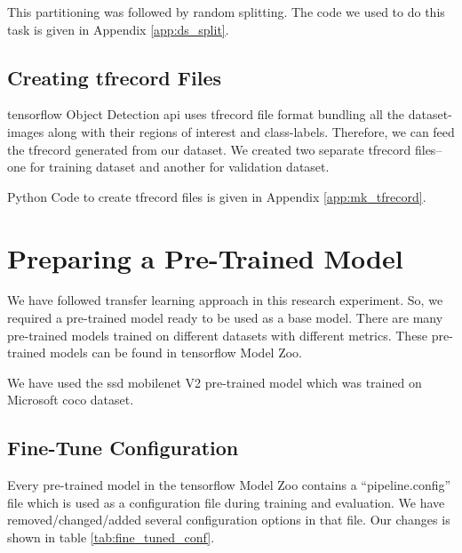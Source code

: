             This partitioning was followed by random splitting. The code we used to do this task is given in Appendix \ref{app:ds_split}.
            
        \subsection{Creating tfrecord Files}
            \gls{tensorflow} Object Detection \acrshort{api} uses \gls{tfrecord} file format bundling all the dataset-images along with their regions of interest and class-labels. Therefore, we can feed the tfrecord generated from our dataset. We created two separate tfrecord files-- one for training dataset and another for validation dataset.
            
            Python Code to create \gls{tfrecord} files is given in Appendix \ref{app:mk_tfrecord}.
            
    \section{Preparing a Pre-Trained Model}
        We have followed transfer learning approach in this research experiment. So, we required a pre-trained model ready to be used as a base model. There are many pre-trained models trained on different datasets with different metrics. These pre-trained models can be found in \gls{tensorflow} Model Zoo.
        
        We have used the \acrshort{ssd} \gls{mobilenet} V2 pre-trained model which was trained on Microsoft \acrshort{coco} dataset.
        
        \subsection{Fine-Tune Configuration}
            Every pre-trained model in the \gls{tensorflow} Model Zoo contains a ``pipeline.config'' file which is used as a configuration file during training and evaluation. We have removed/changed/added several configuration options in that file. Our changes is shown in table \ref{tab:fine_tuned_conf}.
            
